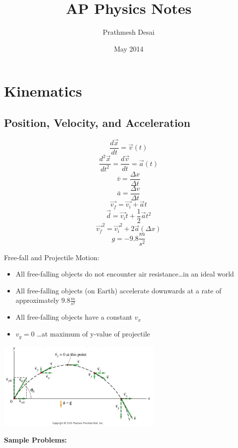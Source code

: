 \documentclass{article}
\title{AP Physics Notes}
\author{Prathmesh Desai}
\date{May 2014}
\begin{document}
\maketitle
\tableofcontents

\newpage
\section{Kinematics}
\subsection{Position, Velocity, and Acceleration}
\begin{multicols}{2}
  \[
  \frac{d\vec{x}}{dt}=\vec{v}(t)
  \]
  \[
  \frac{d^2\vec{x}}{dt^2}=\frac{d\vec{v}}{dt}=\vec{a}(t)
  \]
  \[
  \bar{v}=\frac{\Delta{x}}{\Delta{t}}
  \]
  \[
  \bar{a}=\frac{\Delta{v}}{\Delta{t}}
  \]
  \[
  \vec{v_f}=\vec{v_i}+\vec{a}t
  \]
  \[
  \vec{d}=\vec{v_i}t+\frac{1}{2}\vec{a}t^2
  \]
  \[
  \vec{v_f}^2=\vec{v_i}^2+2\vec{a}(\Delta{x})
  \]
  \[
  g=-9.8\frac{m}{s^2}
  \]
  
  \columnbreak
  
  Free-fall and Projectile Motion:
  \vspace{3mm}
  \begin{itemize}
  \item All free-falling objects do not encounter air resistance\ldots in an ideal world
  \item All free-falling objects (on Earth) accelerate downwards at a rate of approximately $9.8\frac{m}{s^2}$
  \item All free-falling objects have a constant $v_x$
  \item $v_y=0$ \ldots at maximum of y-value of projectile
  \end{itemize}
  
  \vspace{2ex}
  \includegraphics[width=8cm]{ProjectileMotion.jpg}
\end{multicols}
\noindent\textbf{Sample Problems:}
\end{document}
